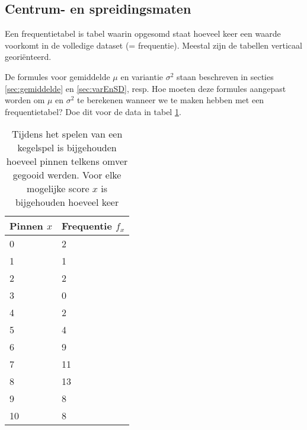 \subsection{Centrum- en spreidingsmaten}

\begin{definition}
	Een frequentietabel is tabel waarin opgesomd staat hoeveel keer een waarde voorkomt in de volledige dataset (= frequentie). Meestal zijn de tabellen verticaal georiënteerd.
\end{definition}

\begin{exercise}
  \label{ex:mean-stdev-freq}
  De formules voor gemiddelde $\mu$ en variantie $\sigma^2$ staan beschreven in secties \ref{sec:gemiddelde} en \ref{sec:varEnSD}, resp. Hoe moeten deze formules aangepast worden om $\mu$ en $\sigma^2$ te berekenen wanneer we te maken hebben met een frequentietabel? Doe dit voor de data in tabel \ref{tab:pinfreq}.
\end{exercise}

\begin{table}
  \centering
  
  \begin{tabular}{@{}ll@{}}
    \toprule
    Pinnen $x$ & Frequentie $f_{x}$ \\ \midrule
    0          & 2                  \\
    1          & 1                  \\
    2          & 2                  \\
    3          & 0                  \\
    4          & 2                  \\
    5          & 4                  \\
    6          & 9                  \\
    7          & 11                 \\
    8          & 13                 \\
    9          & 8                  \\
    10         & 8
  \end{tabular}
  \caption{Tijdens het spelen van een kegelspel is bijgehouden hoeveel pinnen telkens omver gegooid werden. Voor elke mogelijke score $x$ is bijgehouden hoeveel keer }
  \label{tab:pinfreq}
\end{table}

